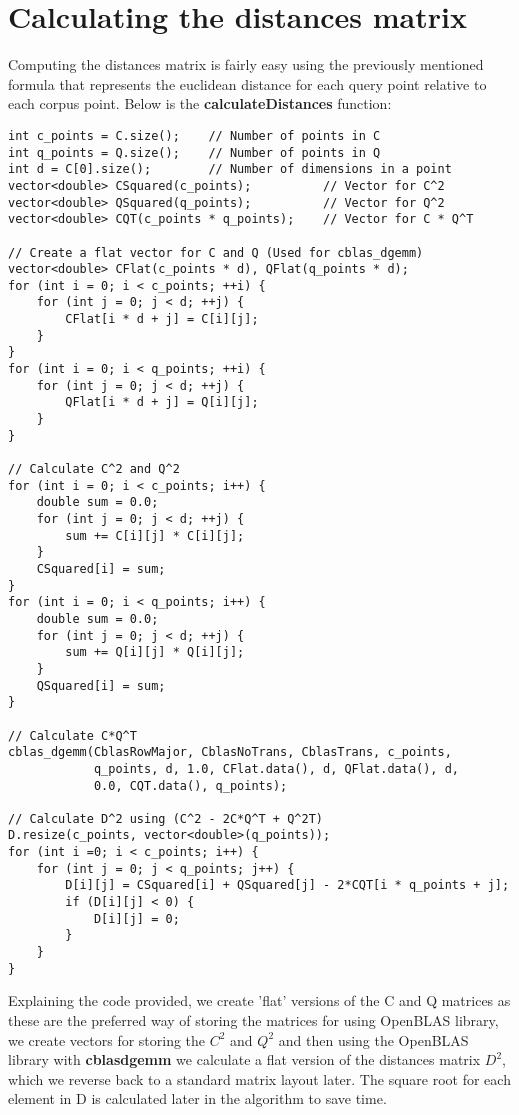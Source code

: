 \documentclass[12pt]{report}
\begin{document}
\section{Calculating the distances matrix}
    Computing the distances matrix is fairly easy using the previously mentioned formula that represents the euclidean distance for each query point relative to each corpus point. Below is the \textbf{calculateDistances} function:
\begin{lstlisting}[style=cppstyle]
int c_points = C.size();    // Number of points in C
int q_points = Q.size();    // Number of points in Q
int d = C[0].size();        // Number of dimensions in a point
vector<double> CSquared(c_points);          // Vector for C^2
vector<double> QSquared(q_points);          // Vector for Q^2
vector<double> CQT(c_points * q_points);    // Vector for C * Q^T

// Create a flat vector for C and Q (Used for cblas_dgemm)
vector<double> CFlat(c_points * d), QFlat(q_points * d);
for (int i = 0; i < c_points; ++i) {
    for (int j = 0; j < d; ++j) {
        CFlat[i * d + j] = C[i][j];
    }
}
for (int i = 0; i < q_points; ++i) {
    for (int j = 0; j < d; ++j) {
        QFlat[i * d + j] = Q[i][j];
    }
}

// Calculate C^2 and Q^2
for (int i = 0; i < c_points; i++) {
    double sum = 0.0;
    for (int j = 0; j < d; ++j) {
        sum += C[i][j] * C[i][j];
    }
    CSquared[i] = sum;
}
for (int i = 0; i < q_points; i++) {
    double sum = 0.0;
    for (int j = 0; j < d; ++j) {
        sum += Q[i][j] * Q[i][j];
    }
    QSquared[i] = sum;
}

// Calculate C*Q^T
cblas_dgemm(CblasRowMajor, CblasNoTrans, CblasTrans, c_points,
            q_points, d, 1.0, CFlat.data(), d, QFlat.data(), d,
            0.0, CQT.data(), q_points);

// Calculate D^2 using (C^2 - 2C*Q^T + Q^2T)
D.resize(c_points, vector<double>(q_points));
for (int i =0; i < c_points; i++) {
    for (int j = 0; j < q_points; j++) {
        D[i][j] = CSquared[i] + QSquared[j] - 2*CQT[i * q_points + j];
        if (D[i][j] < 0) {
            D[i][j] = 0;
        }
    }
}
\end{lstlisting}
    Explaining the code provided, we create 'flat' versions of the C and Q matrices as these are the preferred way of storing the matrices for using OpenBLAS library, we create vectors for storing the \(C^2\) and \(Q^2\) and then using the OpenBLAS library with \textbf{cblas\textunderscore dgemm} we calculate a flat version of the distances matrix \(D^2\), which we reverse back to a standard matrix layout later. The square root for each element in D is calculated later in the algorithm to save time.
\end{document}
